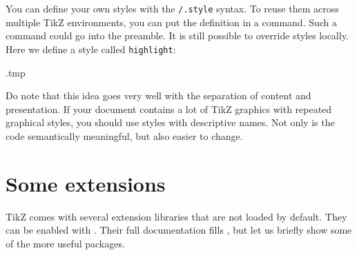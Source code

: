 You can define your own styles with the \verb|/.style| syntax.
To reuse them across multiple TikZ environments,
you can put the definition in a  command.
Such a command could go into the preamble.
It is still possible to override styles locally.
Here we define a style called \verb|highlight|:
%
\begin{VerbatimOut}{\jobname.tmp}
\centering
{}
\newcommand{\dogfile}{pictures/TheDogs.jpg}

\end{VerbatimOut}
\ShowExampleBelow[2]


\begin{practices}
Do note that this idea goes very well with the separation of content and presentation.
If your document contains a lot of TikZ graphics with repeated graphical styles,
you should use styles with descriptive names.
Not only is the code semantically meaningful, but also easier to change.
\end{practices}


%
%
\section{Some extensions}

TikZ comes with several extension libraries that are not loaded by default.
They can be enabled with .
Their full documentation fills \cite[Section~V]{tikz},
but let us briefly show some of the more useful packages.


